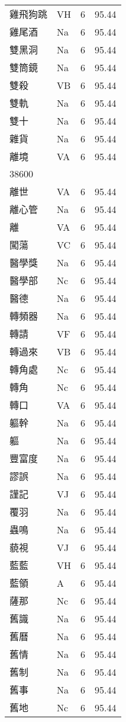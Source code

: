 \documentclass[twocolumn]{book}
\begin{document}
\begin{supertabular}{llrr}
雞飛狗跳 & VH & 6 &  95.44\\
雞尾酒 & Na & 6 &  95.44\\
雙黑洞 & Na & 6 &  95.44\\
雙筒鏡 & Na & 6 &  95.44\\
雙殺 & VB & 6 &  95.44\\
雙軌 & Na & 6 &  95.44\\
雙十 & Na & 6 &  95.44\\
雜貨 & Na & 6 &  95.44\\
離境 & VA & 6 &  95.44\\
38600\\
離世 & VA & 6 &  95.44\\
離心管 & Na & 6 &  95.44\\
離 & VA & 6 &  95.44\\
闖蕩 & VC & 6 &  95.44\\
醫學獎 & Na & 6 &  95.44\\
醫學部 & Nc & 6 &  95.44\\
醫德 & Na & 6 &  95.44\\
轉頻器 & Na & 6 &  95.44\\
轉請 & VF & 6 &  95.44\\
轉過來 & VB & 6 &  95.44\\
轉角處 & Nc & 6 &  95.44\\
轉角 & Nc & 6 &  95.44\\
轉口 & VA & 6 &  95.44\\
軀幹 & Na & 6 &  95.44\\
軀 & Na & 6 &  95.44\\
豐富度 & Na & 6 &  95.44\\
謬誤 & Na & 6 &  95.44\\
謹記 & VJ & 6 &  95.44\\
覆羽 & Na & 6 &  95.44\\
蟲鳴 & Na & 6 &  95.44\\
藐視 & VJ & 6 &  95.44\\
藍藍 & VH & 6 &  95.44\\
藍領 & A & 6 &  95.44\\
薩那 & Nc & 6 &  95.44\\
舊識 & Na & 6 &  95.44\\
舊曆 & Na & 6 &  95.44\\
舊情 & Na & 6 &  95.44\\
舊制 & Na & 6 &  95.44\\
舊事 & Na & 6 &  95.44\\
舊地 & Nc & 6 &  95.44\\

\end{supertabular}
\end{document}
